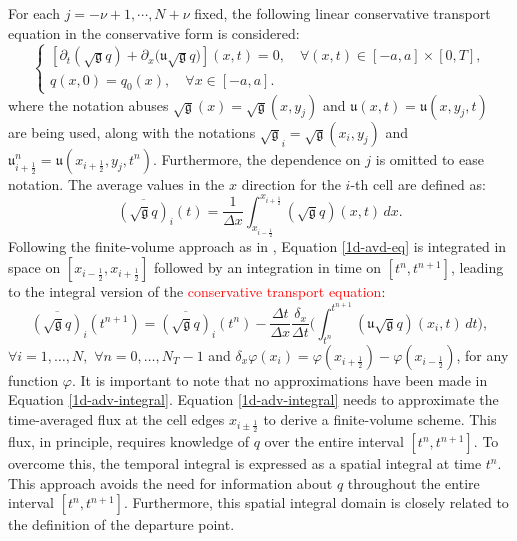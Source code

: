 \documentclass[preprint,12pt]{elsarticle}
\begin{document}
\begin{linenumbers}
For each $j=-\nu+1, \cdots, N+\nu$ fixed, the following linear conservative transport equation in the conservative form is considered:
\begin{equation}
	\label{1d-avd-eq}
	\begin{cases}
		[{\partial_t (\sqrt{\mathfrak{g}} {q})} + {\partial_x (\mathfrak{u}\sqrt{\mathfrak{g}}{q}})](x, t)
		= 0, \quad \forall (x,t) \in [-a, a]\times [0,T],\\
		q(x,0) = q_0(x), \quad \forall x \in [-a, a].
	\end{cases}
\end{equation}
where the notation abuses $\sqrt{\mathfrak{g}}(x) = \sqrt{\mathfrak{g}}(x,y_j)$ and $\mathfrak{u}(x,t) = \mathfrak{u}(x,y_j,t)$ are being used, along with the notations $\sqrt{\mathfrak{g}}_i = \sqrt{\mathfrak{g}}(x_i,y_j)$ and ${\mathfrak{u}}_{i+\frac{1}{2}}^n = {\mathfrak{u}}(x_{i+\frac{1}{2}},y_j,t^n)$.
Furthermore, the dependence on $j$ is omitted to ease notation.
The average values in the $x$ direction for the $i$-th cell are defined as:
\begin{equation}
	\label{1d-average-def}
	\overline{(\sqrt{\mathfrak{g}}q)}_{i}(t) = \frac{1}{\Delta x} \int_{x_{i-\frac{1}{2}}}^{x_{i+\frac{1}{2}}} {(\sqrt{\mathfrak{g}}q)}(x,t) \,dx.
\end{equation}
Following the finite-volume approach as in \cite{leveque:1990},
Equation \eqref{1d-avd-eq} is integrated in space on 
$[x_{i-\frac{1}{2}},x_{i+\frac{1}{2}}]$
followed by an integration in time on $[t^{n},t^{n+1}]$, leading to the integral version of the \textcolor{red}{conservative transport equation}:
\begin{equation}
	\label{1d-adv-integral}
	\overline{(\sqrt{\mathfrak{g}}q)}_i(t^{n+1}) =  \overline{(\sqrt{\mathfrak{g}}q)}_i(t^{n}) -
	\frac{\Delta t}{\Delta x}
	\frac{\delta_x}{\Delta t}\bigg(
	\int_{t^{n}}^{t^{n+1}}
	{(\mathfrak{u}{\sqrt{\mathfrak{g}}q})}(x_i, t) \,dt \bigg),
\end{equation}
$ \forall i = 1, \ldots, N,$ $\forall n = 0, \ldots, N_T-1$
and $\delta_x \varphi(x_i) = \varphi(x_{i+\frac{1}{2}})-\varphi(x_{i-\frac{1}{2}})$, for any function $\varphi$.
It is important to note that no approximations have been made in Equation \eqref{1d-adv-integral}. 
Equation \eqref{1d-adv-integral} needs to approximate the time-averaged flux at the cell edges $x_{i\pm\frac{1}{2}}$
to derive a finite-volume scheme. This flux, in principle, requires knowledge of $q$ over the entire interval $[t^n, t^{n+1}]$. 
To overcome this, the temporal integral is expressed as a spatial integral at time $t^n$. 
This approach avoids the need for information about $q$ throughout the entire interval $[t^n, t^{n+1}]$. 
Furthermore, this spatial integral domain is closely related to the definition of the departure point. 


\end{linenumbers}
\end{document}
